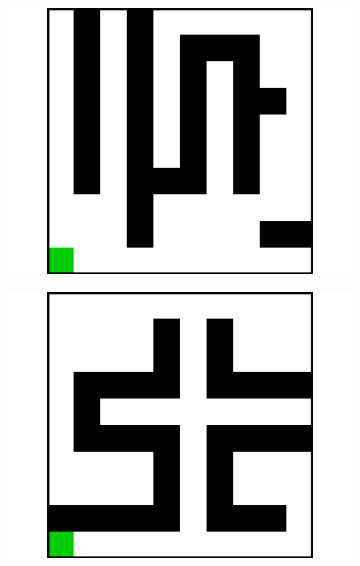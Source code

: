 \documentclass{article}
\begin{document}
\begin{figure}[t]
\begin{subfigure}[t]{0.18\textwidth}
    \includegraphics[width=\textwidth]{images/maze/maze12.pdf}
    \caption{}
  \end{subfigure}
  \begin{subfigure}[t]{0.18\textwidth}
    \includegraphics[width=\textwidth]{images/maze/maze13.pdf}
    \caption{}
  \end{subfigure}
  \begin{subfigure}[t]{0.18\textwidth}

\end{subfigure}
\end{figure}
\end{document}
